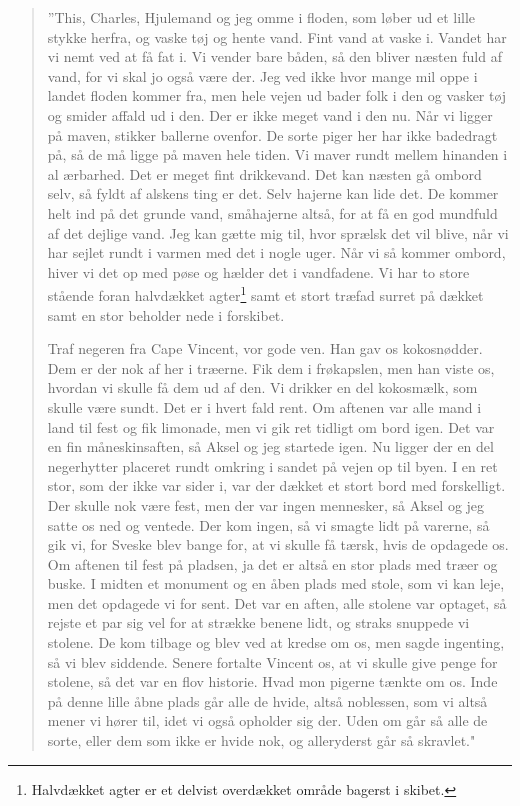 \begin{quote}
''This, Charles, Hjulemand og jeg omme i floden, som løber ud et lille
stykke herfra, og vaske tøj og hente vand. Fint vand at vaske i. Vandet
har vi nemt ved at få fat i. Vi vender bare båden, så den bliver næsten
fuld af vand, for vi skal jo også være der. Jeg ved ikke hvor mange mil
oppe i landet floden kommer fra, men hele vejen ud bader folk i den og
vasker tøj og smider affald ud i den. Der er ikke meget vand i den nu.
Når vi ligger på maven, stikker ballerne ovenfor. De sorte piger her har
ikke badedragt på, så de må ligge på maven hele tiden. Vi maver rundt
mellem hinanden i al ærbarhed. Det er meget fint drikkevand. Det kan
næsten gå ombord selv, så fyldt af alskens ting er det. Selv hajerne kan
lide det. De kommer helt ind på det grunde vand, småhajerne altså, for
at få en god mundfuld af det dejlige vand. Jeg kan gætte mig til, hvor
sprælsk det vil blive, når vi har sejlet rundt i varmen med det i nogle
uger. Når vi så kommer ombord, hiver vi det op med pøse og hælder det i
vandfadene. Vi har to store stående foran halvdækket agter\footnote{Halvdækket
  agter er et delvist overdækket område bagerst i skibet.} samt et stort
træfad surret på dækket samt en stor beholder nede i forskibet.

Traf negeren fra Cape Vincent, vor gode ven. Han gav os kokosnødder. Dem
er der nok af her i træerne. Fik dem i frøkapslen, men han viste os,
hvordan vi skulle få dem ud af den. Vi drikker en del kokosmælk, som
skulle være sundt. Det er i hvert fald rent. Om aftenen var alle mand i
land til fest og fik limonade, men vi gik ret tidligt om bord igen. Det
var en fin måneskinsaften, så Aksel og jeg startede igen. Nu ligger der
en del negerhytter placeret rundt omkring i sandet på vejen op til byen.
I en ret stor, som der ikke var sider i, var der dækket et stort bord
med forskelligt. Der skulle nok være fest, men der var ingen mennesker,
så Aksel og jeg satte os ned og ventede. Der kom ingen, så vi smagte
lidt på varerne, så gik vi, for Sveske blev bange for, at vi skulle få
tærsk, hvis de opdagede os. Om aftenen til fest på pladsen, ja det er
altså en stor plads med træer og buske. I midten et monument og en åben
plads med stole, som vi kan leje, men det opdagede vi for sent. Det var
en aften, alle stolene var optaget, så rejste et par sig vel for at
strække benene lidt, og straks snuppede vi stolene. De kom tilbage og
blev ved at kredse om os, men sagde ingenting, så vi blev siddende.
Senere fortalte Vincent os, at vi skulle give penge for stolene, så det
var en flov historie. Hvad mon pigerne tænkte om os. Inde på denne lille
åbne plads går alle de hvide, altså noblessen, som vi altså mener vi
hører til, idet vi også opholder sig der. Uden om går så alle de sorte,
eller dem som ikke er hvide nok, og alleryderst går så skravlet."
\end{quote}

